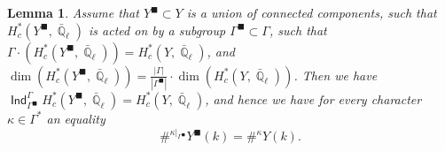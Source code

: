 \documentclass{article}
\DeclareMathOperator{\Ind}{\mathsf{Ind}}
\DeclareMathOperator{\Qb}{\mathbb{Q}}
\theoremstyle{definition}
\theoremstyle{plain}
\newtheorem{lemma}[definition]{Lemma}
\begin{document}
\begin{lemma}\label{lemma:easystab}
Assume that $Y^{\blacksquare} \subset Y$ is a union of connected components, such that $H^*_c(Y^\blacksquare,\bar{\Qb}_{\ell})$ is acted on by a subgroup $\Gamma^{\blacksquare} \subset \Gamma$, such that $\Gamma\cdot{} (H^*_c(Y^\blacksquare,\bar{\Qb}_{\ell})) = H^*_c(Y,\bar{\Qb}_{\ell})$, and $\dim (H^*_c(Y^\blacksquare,\bar{\Qb}_{\ell})) = \frac{|\Gamma|}{|\Gamma^{\blacksquare}|} \cdot{} \dim (H^*_c(Y,\bar{\Qb}_{\ell}))$.
Then we have $\Ind_{\Gamma^{\blacksquare}}^{\Gamma}H^*_c(Y^\blacksquare,\bar{\Qb}_{\ell}) = H^*_c(Y,\bar{\Qb}_{\ell})$, and hence we have
for every character $\kappa \in \Gamma^{*}$ an equality
$$\#^{\kappa|_{\Gamma^{\blacksquare}}}Y^{\blacksquare}(k) = \#^{\kappa}Y(k).$$
\end{lemma}
\end{document}
